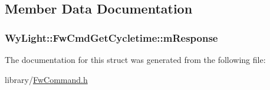 \subsection{Member Data Documentation}
\hypertarget{struct_wy_light_1_1_fw_cmd_get_cycletime_aee08eb755ea6f308d9ce9cd78adc9517}{
\subsubsection[{m\-Response}]{ Wy\-Light\-::\-Fw\-Cmd\-Get\-Cycletime\-::m\-Response}}\label{struct_wy_light_1_1_fw_cmd_get_cycletime_aee08eb755ea6f308d9ce9cd78adc9517}


The documentation for this struct was generated from the following file\-:\begin{DoxyCompactItemize}
\item 
library/\hyperlink{_fw_command_8h}{Fw\-Command.\-h}\end{DoxyCompactItemize}
